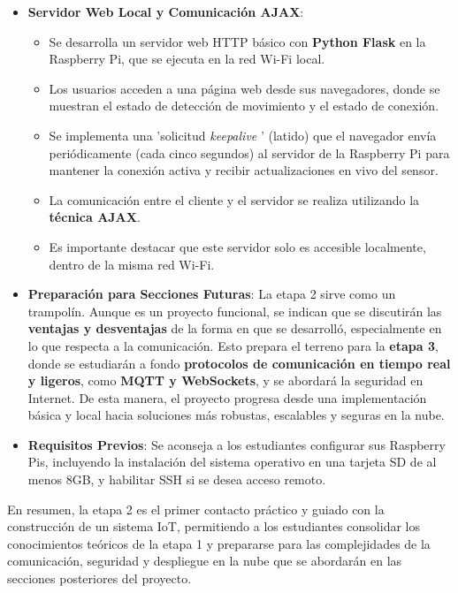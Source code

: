 \documentclass{report}
\begin{document}
\begin{itemize}
    \item \textbf{Servidor Web Local y Comunicación AJAX}:
    \begin{itemize}
        \item Se desarrolla un servidor web HTTP básico con \textbf{Python Flask} en la Raspberry Pi, que se ejecuta en la red Wi-Fi local.
        \item Los usuarios acceden a una página web desde sus navegadores, donde se muestran el estado de detección de movimiento y el estado de conexión.
        \item Se implementa una  'solicitud \textit{keepalive} ' (latido) que el navegador envía periódicamente (cada cinco segundos) al servidor 
        de la Raspberry Pi para mantener la conexión activa y recibir actualizaciones en vivo del sensor.
        \item La comunicación entre el cliente y el servidor se realiza utilizando la \textbf{técnica AJAX}.
        \item Es importante destacar que este servidor solo es accesible localmente, dentro de la misma red Wi-Fi.
    \end{itemize}

    \item \textbf{Preparación para Secciones Futuras}: La etapa 2 sirve como un trampolín. Aunque es un proyecto funcional, se  indican que se 
    discutirán las \textbf{ventajas y desventajas} de la forma en que se desarrolló, especialmente en lo que respecta a la comunicación. Esto prepara el 
    terreno para la \textbf{etapa 3}, donde se estudiarán a fondo \textbf{protocolos de comunicación en tiempo real y ligeros}, como \textbf{MQTT y 
    WebSockets}, y se abordará la seguridad en Internet. De esta manera, el proyecto progresa desde una implementación básica y local hacia soluciones 
    más robustas, escalables y seguras en la nube.
    
    \item \textbf{Requisitos Previos}: Se aconseja a los estudiantes configurar sus Raspberry Pis, incluyendo la instalación del sistema operativo en una 
    tarjeta SD de al menos 8GB, y habilitar SSH si se desea acceso remoto.
\end{itemize}
En resumen, la etapa 2 es el primer contacto práctico y guiado con la construcción de un sistema IoT, permitiendo a los estudiantes consolidar los 
conocimientos teóricos de la etapa 1 y prepararse para las complejidades de la comunicación, seguridad y despliegue en la nube que se abordarán en 
las secciones posteriores del proyecto.
\end{document}

